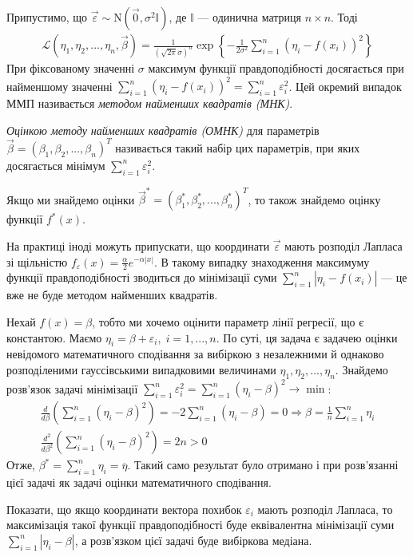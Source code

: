 Припустимо, що $\vec{\varepsilon} \sim \mathrm{N}(\vec{0}, \sigma^2 \mathbb{I})$, де
$\mathbb{I}$ --- одинична матриця $n\times n$. Тоді
\begin{gather*}
    \mathcal{L}\left(\eta_1, \eta_2, ..., \eta_n, \vec{\beta}\right) = 
    \frac{1}{\left(\sqrt{2\pi} \sigma\right)^n} \exp\left\{
        -\frac{1}{2\sigma^2} \sum_{i=1}^n (\eta_i - f(x_i))^2
        \right\}
\end{gather*}
При фіксованому значенні $\sigma$ максимум функції правдоподібності досягається
при найменшому значенні $\sum\limits_{i=1}^n (\eta_i - f(x_i))^2 = \sum\limits_{i=1}^n \varepsilon_i^2$.
Цей окремий випадок ММП називається \emph{методом найменших квадратів (МНК)}.
\begin{definition}
    \emph{Оцінкою методу найменших квадратів (ОМНК)} для параметрів $\vec{\beta} = (\beta_1, \beta_2, ..., \beta_n)^T$
    називається такий набір цих параметрів, при яких досягається мінімум $\sum\limits_{i=1}^n \varepsilon_i^2$.
\end{definition}
Якщо ми знайдемо оцінки $\vec{\beta}^* = (\beta_1^*, \beta_2^*, ..., \beta_n^*)^T$,
то також знайдемо оцінку функції $f^*(x)$.
\begin{remark}
    На практиці іноді можуть припускати, що координати $\vec{\varepsilon}$ мають 
    розподіл Лапласа зі щільністю $f_\varepsilon(x) = \frac{\alpha}{2} e^{-\alpha|x|}$.
    В такому випадку знаходження максимуму функції правдоподібності зводиться
    до мінімізації суми $\sum\limits_{i=1}^n |\eta_i - f(x_i)|$ --- це вже не буде
    методом найменших квадратів.
\end{remark}
\begin{example}\label{intercept_fit}
    Нехай $f(x) = \beta$, тобто ми хочемо оцінити параметр лінії регресії, що є константою.
    Маємо $\eta_i = \beta + \varepsilon_i, \; i = 1,...,n$. По суті, ця задача є задачею оцінки невідомого математичного сподівання
    за вибіркою з незалежними й однаково розподіленими гауссівськими випадковими величинами
    $\eta_1, \eta_2, ..., \eta_n$. Знайдемо розв'язок задачі мінімізації
    $\sum\limits_{i=1}^n \varepsilon_i^2 = \sum\limits_{i=1}^n (\eta_i - \beta)^2 \to \min$:
    \begin{gather*}
        \frac{d}{d\beta} \left(\sum\limits_{i=1}^n (\eta_i - \beta)^2\right) = 
        - 2 \sum\limits_{i=1}^n (\eta_i - \beta) = 0 \Rightarrow \beta = \frac{1}{n} \sum\limits_{i=1}^n \eta_i \\
        \frac{d^2}{d\beta^2} \left(\sum\limits_{i=1}^n (\eta_i - \beta)^2\right) = 2n > 0
    \end{gather*}
    Отже, $\beta^* = \sum\limits_{i=1}^n \eta_i = \overline{\eta}$. Такий само результат було
    отримано і при розв'язанні цієї задачі як задачі оцінки математичного сподівання.
\end{example}
\begin{exercise}
    Показати, що якщо координати вектора похибок $\varepsilon_i$ мають розподіл Лапласа, то максимізація
    такої функції правдоподібності буде еквівалентна мінімізації суми
    $\sum\limits_{i=1}^n |\eta_i - \beta|$, а розв'язком цієї задачі буде вибіркова медіана.
\end{exercise}

